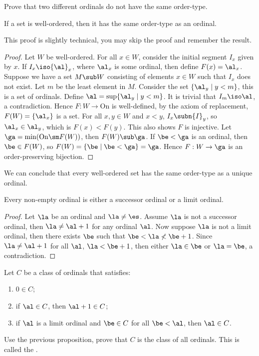 \documentclass[10pt]{article}
\begin{document}
\begin{problem}
    Prove that two different ordinals do not have the same order-type.
\end{problem}
\begin{proposition}
    If a set is well-ordered, then it has the same order-type as an ordinal.
\end{proposition}
\par
This proof is slightly technical, you may skip the proof and remember the result.
\begin{proof}
    Let $W$ be well-ordered. For all $x\in W$, consider the initial segment ${I}_{x}$ given by $x$. If ${I}_{x}\iso{\al}_{x}$, where ${\al}_{x}$ is some ordinal, then define $F(x)={\al}_{x}$. Suppose we have a set $M\sub W$ consisting of elements $x\in W$ such that ${I}_{x}$ does not exist. Let $m$ be the least element in $M$. Consider the set $\{{\al}_{y}\mid y<m\}$, this is a set of ordinals. Define $\al=\sup\{{\al}_{y}\mid y<m\}$. It is trivial that ${I}_{m}\iso\al$, a contradiction. Hence $F:W\to\text{On}$ is well-defined, by the axiom of replacement, $F(W)=\{{\al}_{x}\}$ is a set. For all $x,y\in W$ and $x<y$, ${I}_{x}\subn{I}_{y}$, so ${\al}_{x}\in{\al}_{y}$, which is $F(x)<F(y)$. This also shows $F$ is injective. Let $\ga=\min(\text{On}\sm F(W))$, then $F(W)\sub\ga$. If $\be<\ga$ is an ordinal, then $\be\in F(W)$, so $F(W)=\{\be\mid\be<\ga\}=\ga$. Hence $F:W\to\ga$ is an order-preserving bijection.
\end{proof}
\par
We can conclude that every well-ordered set has the same order-type as a unique ordinal.
\begin{proposition}
    Every non-empty ordinal is either a successor ordinal or a limit ordinal.
\end{proposition}
\begin{proof}
    Let $\la$ be an ordinal and $\la\ne\es$. Assume $\la$ is not a successor ordinal, then $\la\ne\al+1$ for any ordinal $\al$. Now suppose $\la$ is not a limit ordinal, then there exists $\be$ such that $\be<\la\nless\be+1$. Since $\la\ne\al+1$ for all $\al$, $\la<\be+1$, then either $\la\in\be$ or $\la=\be$, a contradiction.
\end{proof}
\begin{problem}
    Let $C$ be a class of ordinals that satisfies:
    \begin{enumerate}
        \item $0\in C$;
        \item if $\al\in C$, then $\al+1\in C$;
        \item if $\al$ is a limit ordinal and $\be\in C$ for all $\be<\al$, then $\al\in C$.
    \end{enumerate}
    Use the previous proposition, prove that $C$ is the class of all ordinals. This is called the .
\end{problem}
\end{document}
